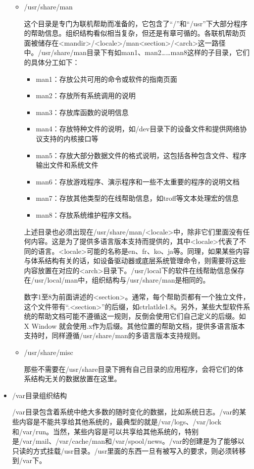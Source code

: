 \begin{itemize}
\begin{itemize}
	\item /usr/share/man
	
	\qquad 这个目录是专门为联机帮助而准备的，它包含了“/”和“/usr”下大部分程序的帮助信息。组织结构看似相当复杂，但还是有章可循的。各联机帮助页面被储存在<mandir>/<locale>/man<section>/<arch>这一路径中。/usr/share/man目录下有如man1、man2……man8这样的子目录，它们的具体分工如下：
		\begin{itemize}
		\item man1：存放公共可用的命令或软件的指南页面
		\item man2：存放所有系统调用的说明
		\item man3：存放库函数的说明信息
		\item man4：存放特种文件的说明，如/dev目录下的设备文件和提供网络协议支持的内核接口等
		\item man5：存放大部分数据文件的格式说明，这包括各种包含文件、程序输出文件和系统文件
		\item man6：存放游戏程序、演示程序和一些不太重要的程序的说明文档
		\item man7：存放其他类型的在线帮助信息，如troff等文本处理宏的信息
		\item man8：存放系统维护程序文档。
		\end{itemize}
	上述目录也必须出现在/usr/share/man/<locale>中，除非它们里面没有任何内容。这是为了提供多语言版本支持而提供的，其中<locale>代表了不同的语言。<locale>可能的名称是en、fr、ko、ja等。同理，如果某些内容与体系结构有关的话，如设备驱动器或底层系统管理命令，则需要将这些内容放置在对应的<arch>目录下。/usr/local下的软件在线帮助信息保存在/usr/local/man中，组织结构与/usr/share/man是相同的。
	
	\qquad 数字1至8为前面讲述的<section>。通常，每个帮助页都有一个独立文件，这个文件带有“.<section>”的后缀，如ctrlatlde1.8。另外，某些大型软件系统的帮助文档可能不遵循这一规则，反倒会使用它们自己定义的后缀。如 X Window 就会使用.x作为后缀。其他位置的帮助文档，提供多语言版本支持时，同样遵循/usr/share/man的多语言版本支持规则。
	
	\item /usr/share/misc
	
	\qquad 那些不需要在/usr/share目录下拥有自己目录的应用程序，会将它们的体系结构无关的数据放置在这里。
	\end{itemize}
	
\item /var目录组织结构

\qquad /var目录包含着系统中绝大多数的随时变化的数据，比如系统日志。/var的某些内容是不能共享给其他系统的，最典型的就是/var/logs、/var/lock和/var/run。当然，某些内容是可以共享给其他系统的，特别是/var/mail、/var/cache/man和/var/spool/news。/var的创建是为了能够以只读的方式挂载/usr目录。/usr里面的东西一旦有被写入的要求，则必须转移到/var下。


\end{itemize}
